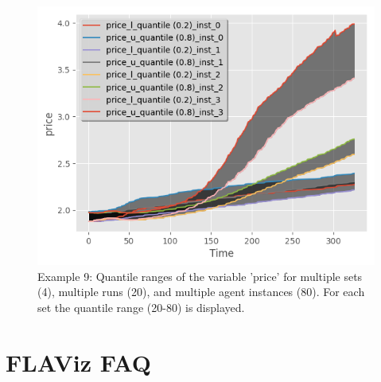 \documentclass[10pt,a4paper]{article}
\begin{document}
\begin{figure}[b!]\centering\leavevmode
\includegraphics[scale=.6]{./plots_tut_2/P7_ts_price.png}
\caption{\footnotesize  Example 9: Quantile ranges of the variable 'price' for multiple sets (4), multiple runs (20), and multiple agent instances (80). For each set the quantile range (20-80) is displayed.}
\end{figure}


\section{FLAViz FAQ}
\end{document}
